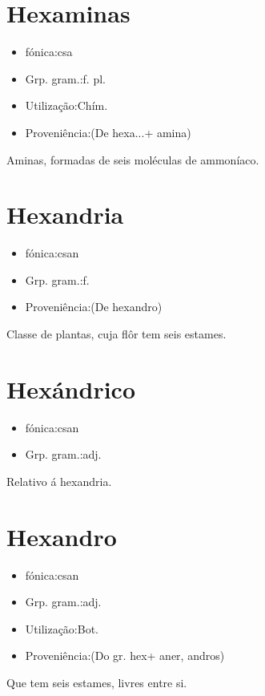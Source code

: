 \documentclass{article}
\begin{document}
\section{Hexaminas}
\begin{itemize}
\item {fónica:csa}
\end{itemize}
\begin{itemize}
\item {Grp. gram.:f. pl.}
\end{itemize}
\begin{itemize}
\item {Utilização:Chím.}
\end{itemize}
\begin{itemize}
\item {Proveniência:(De \textunderscore hexa...\textunderscore  + \textunderscore amina\textunderscore )}
\end{itemize}
Aminas, formadas de seis moléculas de ammoníaco.
\section{Hexandria}
\begin{itemize}
\item {fónica:csan}
\end{itemize}
\begin{itemize}
\item {Grp. gram.:f.}
\end{itemize}
\begin{itemize}
\item {Proveniência:(De \textunderscore hexandro\textunderscore )}
\end{itemize}
Classe de plantas, cuja flôr tem seis estames.
\section{Hexándrico}
\begin{itemize}
\item {fónica:csan}
\end{itemize}
\begin{itemize}
\item {Grp. gram.:adj.}
\end{itemize}
Relativo á hexandria.
\section{Hexandro}
\begin{itemize}
\item {fónica:csan}
\end{itemize}
\begin{itemize}
\item {Grp. gram.:adj.}
\end{itemize}
\begin{itemize}
\item {Utilização:Bot.}
\end{itemize}
\begin{itemize}
\item {Proveniência:(Do gr. \textunderscore hex\textunderscore  + \textunderscore aner\textunderscore , \textunderscore andros\textunderscore )}
\end{itemize}
Que tem seis estames, livres entre si.
\end{document}
